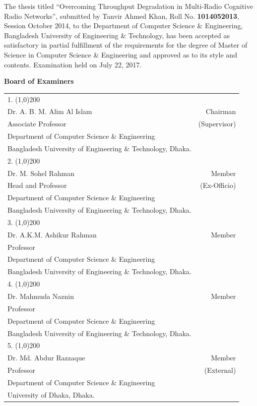  { \singlespacing
 The thesis titled ``Overcoming Throughput Degradation in Multi-Radio Cognitive Radio Networks'', submitted by Tanvir Ahmed Khan, Roll No. \textbf{1014052013}, Session October 2014, to the Department of Computer Science \& Engineering, Bangladesh University of Engineering \& Technology, has been accepted as satisfactory in partial fulfillment of the requirements for the degree of Master of Science in Computer Science \& Engineering and approved as to its style and contents. Examination held on July 22, 2017. \\
 \begin{center}
 	\textbf{\Large Board of Examiners}
 \end{center}
 \begin{tabular}{p{12cm} r }
 	\vspace{0.8cm}
 	1. \line(1,0){200} &  \\
 	Dr. A. B. M. Alim Al Islam & Chairman\\ 
 	Associate Professor & (Supervisor)\\
 	Department of Computer Science \& Engineering & \\
 	Bangladesh University of Engineering \& Technology, Dhaka. & \\
 	\vspace{0.8cm}
 	2. \line(1,0){200} &  \\
 	Dr. M. Sohel Rahman  & Member \\ 
 	Head and Professor & (Ex-Officio)\\
 	Department of Computer Science \& Engineering & \\
 	Bangladesh University of Engineering \& Technology, Dhaka. & \\
 	\vspace{0.8cm}
 	3. \line(1,0){200} &  \\
 	Dr. A.K.M. Ashikur Rahman & Member\\ 
 	Professor &\\
 	Department of Computer Science \& Engineering & \\
 	Bangladesh University of Engineering \& Technology, Dhaka. & \\
 	\vspace{0.8cm}
 	4. \line(1,0){200} &  \\
 	Dr. Mahmuda Naznin & Member\\ 
 	Professor & \\
 	Department of Computer Science \& Engineering & \\
 	Bangladesh University of Engineering \& Technology, Dhaka. & \\
 	\vspace{0.8cm}
 	5. \line(1,0){200} &  \\
 	Dr. Md. Abdur Razzaque & Member\\ 
 	Professor & (External)\\
 	Department of Computer Science \& Engineering & \\
 	University of Dhaka, Dhaka. &\\
 \end{tabular}
 } 
